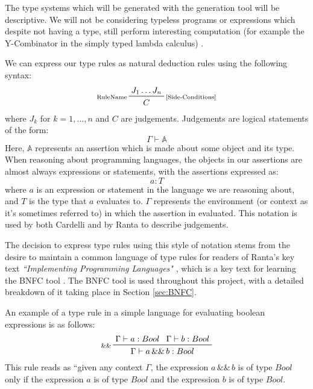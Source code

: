 \documentclass{UoYCSproject}
\begin{document}
The type systems which will be generated with the generation tool will be
descriptive. We will not be considering typeless programs or expressions which
despite not having a type, still perform interesting computation (for example
the Y-Combinator in the simply typed lambda calculus) \cite{NeilJones} 
\cite[p.~28]{SimonPeytonJones} \cite[p.~155]{SimonPeytonJones}.

We can express our type rules as natural deduction rules using the following
syntax:
\begin{displaymath}
    \prftree[l,r]{\scriptsize [Side-Conditions]}{\scriptsize RuleName}{J_1 \dots J_n}{C}
\end{displaymath}
where $J_k$ for $k=1, \dots ,n$ and $C$ are judgements. Judgements are logical 
statements of the form:
\begin{displaymath}
    \Gamma \vdash \mathbb{A}
\end{displaymath}
Here, $\mathbb{A}$ represents an assertion which is made about some object and
its type. When reasoning about programming languages, the objects in our
assertions are almost always expressions or statements, with the assertions
expressed as:
\begin{displaymath}
    a: T
\end{displaymath}
where $a$ is an expression or statement in the language we are reasoning about,
and $T$ is the type that $a$ evaluates to. $\Gamma$ represents the 
environment (or context as it's sometimes referred to) in which the assertion 
in evaluated. This notation is used by both Cardelli \cite[p.~8]{CSHandbook} 
and by Ranta \cite[\S4.4, p.~60]{Ranta} to describe judgements.

The decision to express type rules using this style of notation stems from the 
desire to maintain a common language of type rules for readers of Ranta's key
text \textit{``Implementing Programming Languages"} \cite{Ranta}, which is a key 
text for learning the BNFC tool \cite{BNFC}. The BNFC tool is used throughout
this project, with a detailed breakdown of it taking place in Section 
\ref{sec:BNFC}. 

An example of a type rule in a simple language for evaluating boolean 
expressions is as follows:
\begin{displaymath}
    \prftree[l]{\scriptsize \&\&}{\Gamma \vdash a:Bool}{\Gamma \vdash b:Bool}{\Gamma \vdash a \, \&\& \, b: Bool}
\end{displaymath}
This rule reads as ``given any context $\Gamma$, the expression $a \, \&\& \, b$
is of type $Bool$ only if the expression $a$ is of type $Bool$ and the expression $b$
is of type $Bool$.
\end{document}
